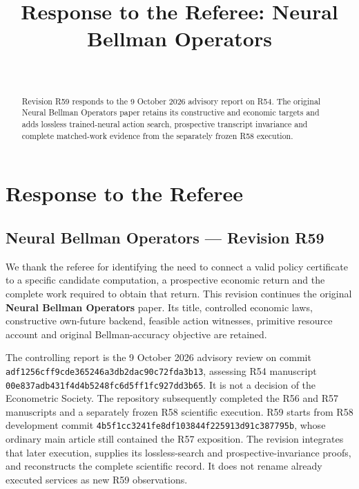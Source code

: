 \documentclass[ecta,nameyear,draft]{econsocart}
\begin{document}
\begin{frontmatter}
\title{Response to the Referee: Neural Bellman Operators}
\begin{aug}
\author[id=au1,addressref={add1}]{~}
\address[id=add1]{Peking University}
\end{aug}
\begin{abstract}Revision R59 responds to the 9 October 2026 advisory report on R54. The original Neural Bellman Operators paper retains its constructive and economic targets and adds lossless trained-neural action search, prospective transcript invariance and complete matched-work evidence from the separately frozen R58 execution.\end{abstract}
\end{frontmatter}
\hypertarget{response-to-the-referee}{%
\section{Response to the Referee}\label{response-to-the-referee}}

\hypertarget{neural-bellman-operators-revision-r59}{%
\subsection{Neural Bellman Operators --- Revision
R59}\label{neural-bellman-operators-revision-r59}}

We thank the referee for identifying the need to connect a valid policy
certificate to a specific candidate computation, a prospective economic
return and the complete work required to obtain that return. This
revision continues the original \textbf{Neural Bellman Operators} paper.
Its title, controlled economic laws, constructive own-future backend,
feasible action witnesses, primitive resource account and original
Bellman-accuracy objective are retained.

The controlling report is the 9 October 2026 advisory review on commit
\nolinkurl{adf1256cff9cde365246a3db2dac90c72fda3b13}, assessing R54
manuscript \nolinkurl{00e837adb431f4d4b5248fc6d5ff1fc927dd3b65}. It is not
a decision of the Econometric Society. The repository subsequently
completed the R56 and R57 manuscripts and a separately frozen R58
scientific execution. R59 starts from R58 development commit
\nolinkurl{4b5f1cc3241fe8df103844f225913d91c387795b}, whose ordinary main
article still contained the R57 exposition. The revision integrates that
later execution, supplies its lossless-search and prospective-invariance
proofs, and reconstructs the complete scientific record. It does not
rename already executed services as new R59 observations.
\end{document}
